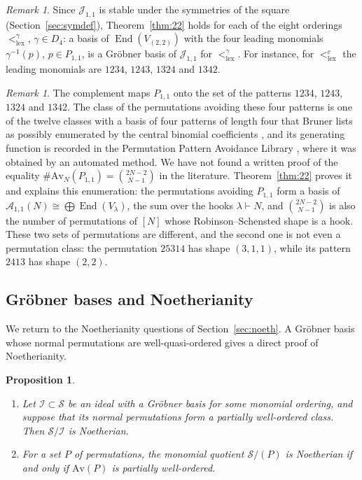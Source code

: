 \documentclass[11pt]{amsart}
\newtheorem{proposition}[theorem]{Proposition}
\theoremstyle{definition}
\theoremstyle{remark}
\newtheorem{remark}[theorem]{Remark}
\newcommand{\cA}{\mathscr{A}}
\newcommand{\cI}{\mathscr{I}}
\newcommand{\cJ}{\mathscr{J}}
\newcommand{\cS}{\mathscr{S}}
\newcommand{\Av}{\mathrm{Av}}
\newcommand{\lex}{\mathrm{lex}}
\newcommand{\End}{\operatorname{End}}
\begin{document}
\begin{remark}\label{rem:22-orderings}
Since $\cJ_{1,1}$ is stable under the symmetries of the square (Section~\ref{sec:symdef}), Theorem~\ref{thm:22} holds for each of the eight orderings $<_\lex^\gamma$, $\gamma\in D_4$: a basis of $\End(V_{(2,2)})$ with the four leading monomials $\gamma^{-1}(p)$, $p\in P_{1,1}$, is a Gr\"obner basis of $\cJ_{1,1}$ for $<_\lex^\gamma$. For instance, for $<_\lex^c$ the leading monomials are $1234$, $1243$, $1324$ and $1342$.
\end{remark}

\begin{remark}\label{rem:central-lit}
The complement maps $P_{1,1}$ onto the set of the patterns $1234$, $1243$, $1324$ and $1342$. The class of the permutations avoiding these four patterns is one of the twelve classes with a basis of four patterns of length four that Bruner lists as possibly enumerated by the central binomial coefficients \cite{Bruner}, and its generating function is recorded in the Permutation Pattern Avoidance Library \cite{PermPAL}, where it was obtained by an automated method. We have not found a written proof of the equality $\#\Av_N(P_{1,1})=\binom{2N-2}{N-1}$ in the literature. Theorem~\ref{thm:22} proves it and explains this enumeration: the permutations avoiding $P_{1,1}$ form a basis of $\cA_{1,1}(N)\cong\bigoplus\End(V_\lambda)$, the sum over the hooks $\lambda\vdash N$, and $\binom{2N-2}{N-1}$ is also the number of permutations of $[N]$ whose Robinson--Schensted shape is a hook. These two sets of permutations are different, and the second one is not even a permutation class: the permutation $25314$ has shape $(3,1,1)$, while its pattern $2413$ has shape $(2,2)$.
\end{remark}

\subsection{Gr\"obner bases and Noetherianity}\label{sec:GB-noeth}

We return to the Noetherianity questions of Section~\ref{sec:noeth}. A Gr\"obner basis whose normal permutations are well-quasi-ordered gives a direct proof of Noetherianity.

\begin{proposition}\label{prop:noeth-criterion}
\begin{enumerate}
\item Let $\cI\subset\cS$ be an ideal with a Gr\"obner basis for some monomial ordering, and suppose that its normal permutations form a partially well-ordered class. Then $\cS/\cI$ is Noetherian.
\item For a set $P$ of permutations, the monomial quotient $\cS/(P)$ is Noetherian if and only if $\Av(P)$ is partially well-ordered.
\end{enumerate}
\end{proposition}
\end{document}
